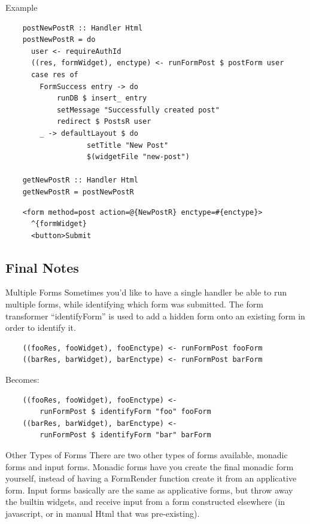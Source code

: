 \documentclass[pdf]{beamer}
\begin{document}
\begin{frame}[fragile]{Example}
  \begin{verbatim}
    postNewPostR :: Handler Html
    postNewPostR = do
      user <- requireAuthId
      ((res, formWidget), enctype) <- runFormPost $ postForm user
      case res of
        FormSuccess entry -> do
            runDB $ insert_ entry
            setMessage "Successfully created post"
            redirect $ PostsR user
        _ -> defaultLayout $ do
                   setTitle "New Post"
                   $(widgetFile "new-post")
    
    getNewPostR :: Handler Html
    getNewPostR = postNewPostR
  \end{verbatim}
  \pause
  \begin{verbatim}
    <form method=post action=@{NewPostR} enctype=#{enctype}>
      ^{formWidget}
      <button>Submit
  \end{verbatim}
\end{frame}

\subsection{Final Notes}
\begin{frame}[fragile]{Multiple Forms}
  Sometimes you'd like to have a single handler be able to run
  multiple forms, while identifying which form was submitted. The form
  transformer ``identifyForm'' is used to add a hidden form onto an
  existing form in order to identify it.\\
  \begin{verbatim}
    ((fooRes, fooWidget), fooEnctype) <- runFormPost fooForm
    ((barRes, barWidget), barEnctype) <- runFormPost barForm
  \end{verbatim}
  Becomes:\\
  \begin{verbatim}
    ((fooRes, fooWidget), fooEnctype) <-
        runFormPost $ identifyForm "foo" fooForm
    ((barRes, barWidget), barEnctype) <-
        runFormPost $ identifyForm "bar" barForm
  \end{verbatim}
\end{frame}

\begin{frame}{Other Types of Forms}
  There are two other types of forms available, monadic forms and
  input forms. Monadic forms have you create the final monadic form
  yourself, instead of having a FormRender function create it from an
  applicative form. Input forms basically are the same as applicative
  forms, but throw away the builtin widgets, and receive input from a
  form constructed elsewhere (in javascript, or in manual Html that
  was pre-existing).
\end{frame}
\end{document}
